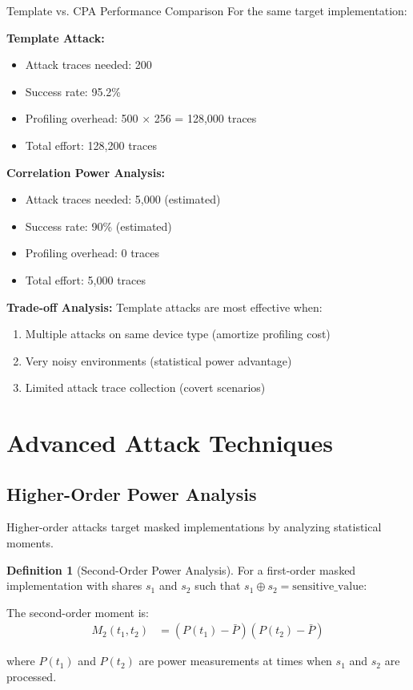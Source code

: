 \documentclass[11pt,a4paper]{article}
\theoremstyle{definition}
\newtheorem{definition}{Definition}[section]
\begin{document}
\begin{examplebox}{Template vs. CPA Performance Comparison}
For the same target implementation:

\textbf{Template Attack:}
\begin{itemize}
    \item Attack traces needed: 200
    \item Success rate: 95.2\%
    \item Profiling overhead: 500 × 256 = 128,000 traces
    \item Total effort: 128,200 traces
\end{itemize}

\textbf{Correlation Power Analysis:}
\begin{itemize}
    \item Attack traces needed: 5,000 (estimated)
    \item Success rate: 90\% (estimated)
    \item Profiling overhead: 0 traces
    \item Total effort: 5,000 traces
\end{itemize}

\textbf{Trade-off Analysis:}
Template attacks are most effective when:
\begin{enumerate}
    \item Multiple attacks on same device type (amortize profiling cost)
    \item Very noisy environments (statistical power advantage)
    \item Limited attack trace collection (covert scenarios)
\end{enumerate}
\end{examplebox}

\section{Advanced Attack Techniques}

\subsection{Higher-Order Power Analysis}

Higher-order attacks target masked implementations by analyzing statistical moments.

\begin{definition}[Second-Order Power Analysis]
For a first-order masked implementation with shares $s_1$ and $s_2$ such that $s_1 \oplus s_2 = \text{sensitive\_value}$:

The second-order moment is:
\begin{align}
M_2(t_1, t_2) &= (P(t_1) - \bar{P})(P(t_2) - \bar{P})
\end{align}

where $P(t_1)$ and $P(t_2)$ are power measurements at times when $s_1$ and $s_2$ are processed.
\end{definition}
\end{document}
